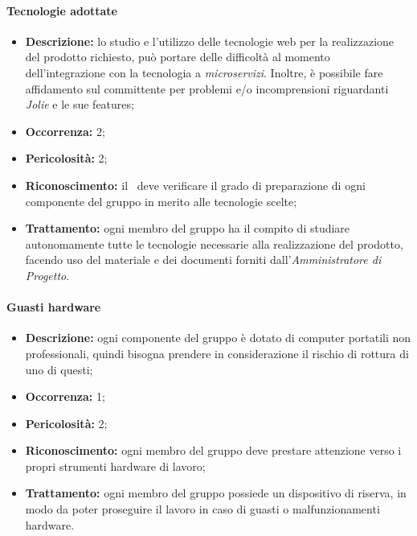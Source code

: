 \paragraph{Tecnologie adottate}
\begin{itemize}
	\item \textbf{Descrizione:} lo studio e l'utilizzo delle tecnologie web per la realizzazione del prodotto richiesto, può portare delle difficoltà al momento dell'integrazione con la tecnologia a \textit{microservizi}. Inoltre, è possibile fare affidamento sul committente per problemi e/o incomprensioni riguardanti \textit{Jolie} e le sue features;
	\item \textbf{Occorrenza:} 2;
	\item \textbf{Pericolosità:} 2;
	\item \textbf{Riconoscimento:} il \textit{\RdP}\ deve verificare il grado di preparazione di ogni componente del gruppo in merito alle tecnologie scelte;
	\item \textbf{Trattamento:} ogni membro del gruppo ha il compito di studiare autonomamente tutte le tecnologie necessarie alla realizzazione del prodotto, facendo uso del materiale e dei documenti forniti dall’\textit{Amministratore di Progetto}.
\end{itemize}

\paragraph{Guasti hardware}
\begin{itemize}
	\item \textbf{Descrizione:} ogni componente del gruppo è dotato di computer portatili non professionali, quindi bisogna prendere in considerazione il rischio di rottura di uno di questi;
	\item \textbf{Occorrenza:} 1;
	\item \textbf{Pericolosità:} 2;
	\item \textbf{Riconoscimento:} ogni membro del gruppo deve prestare attenzione verso i propri strumenti hardware di lavoro;
	\item \textbf{Trattamento:} ogni membro del gruppo possiede un dispositivo di riserva, in modo da poter proseguire il lavoro in caso di guasti o malfunzionamenti hardware.
\end{itemize}

